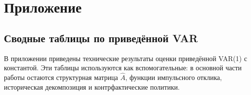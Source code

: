 \section*{Приложение}

\subsection*{Сводные таблицы по приведённой VAR}

В приложении приведены технические результаты оценки приведённой VAR(1) с константой. Эти таблицы используются как вспомогательные: в основной части работы остаются структурная матрица $\hat A$, функции импульсного отклика, историческая декомпозиция и контрфактические политики.









